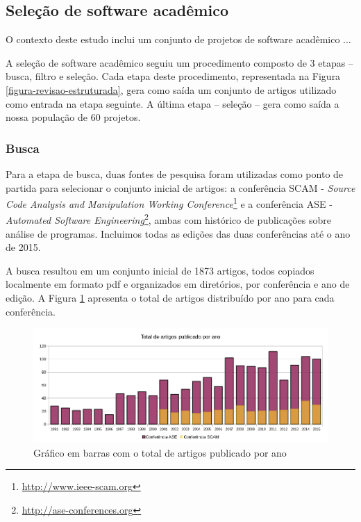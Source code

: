 \subsection{Seleção de software acadêmico}

O contexto deste estudo inclui um conjunto de projetos de software acadêmico ...

A seleção de software acadêmico seguiu um procedimento
composto de 3 etapas -- busca, filtro e seleção.
Cada etapa deste procedimento, representada na Figura \ref{figura-revisao-estruturada}, gera
como saída um conjunto de artigos utilizado como entrada na etapa seguinte.
A última etapa -- seleção -- gera como saída a nossa população de 60 projetos.

\subsubsection{Busca}

Para a etapa de busca, duas fontes de pesquisa foram utilizadas como ponto de partida para
selecionar o conjunto inicial de artigos: 
a conferência SCAM - {\it Source Code Analysis and
Manipulation Working Conference}\footnote{\url{http://www.ieee-scam.org}} e 
a conferência ASE - {\it Automated Software Engineering}\footnote{\url{http://ase-conferences.org}},
ambas com histórico de publicações sobre análise de programas.
Incluimos todas as edições das duas conferências até o ano de 2015.

A busca resultou em um conjunto inicial de 1873 artigos,
todos copiados localmente em formato pdf e organizados em diretórios, por conferência
e ano de edição.
A Figura \ref{artigos-por-ano} apresenta o total de artigos distribuído
por ano para cada conferência.

\begin{figure}[h]
  \center
  \includegraphics[scale=0.65]{imagens/artigos-por-ano.png}
  \caption{Gráfico em barras com o total de artigos publicado por ano}
  \label{artigos-por-ano}
\end{figure}

